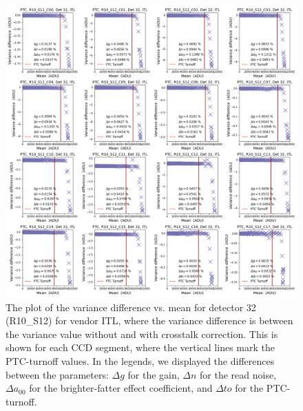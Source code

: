 \begin{figure}[!htb]
    \centering
    \includegraphics[width=\textwidth]{Figures/ptc_crosstalk32.png}
    \caption{The plot of the variance difference vs. mean for detector 32 (R10\_S12) for vendor ITL, where the variance difference is between the variance value without and with crosstalk correction. This is shown for each CCD segment, where the vertical lines mark the  PTC-turnoff values. In the legends, we displayed the differences between the parameters:  $\Delta g$ for the gain, $\Delta n$ for the read noise, $\Delta a_{00}$ for the brighter-fatter effect coefficient, and $\Delta to$ for the PTC-turnoff.}
    \label{fig:crosstalk_corr32}
\end{figure}

